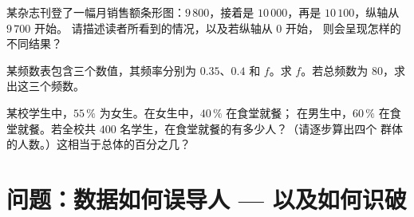 \begin{exercise}[$\star\star$]\label{exo:g7:stats:9}
某杂志刊登了一幅月销售额条形图：$9\,800$，接着是
$10\,000$，再是 $10\,100$，纵轴从 $9\,700$ 开始。
请描述读者所看到的情况，以及若纵轴从 $0$ 开始，
则会呈现怎样的不同结果？
\end{exercise}

\begin{exercise}[$\star\star$]\label{exo:g7:stats:10}
某频数表包含三个数值，其频率分别为 $0.35$、$0.4$ 和
$f$。求 $f$。若总频数为 $80$，求出这三个频数。
\end{exercise}

\begin{exercise}[$\star\star\star$]\label{exo:g7:stats:11}
某校学生中，$55\,\%$ 为女生。在女生中，$40\,\%$ 在食堂就餐；
在男生中，$60\,\%$ 在食堂就餐。若全校共
$400$ 名学生，在食堂就餐的有多少人？（请逐步算出四个
群体的人数。）这相当于总体的百分之几？
\end{exercise}

\section{问题：数据如何误导人 --- 以及如何识破}

